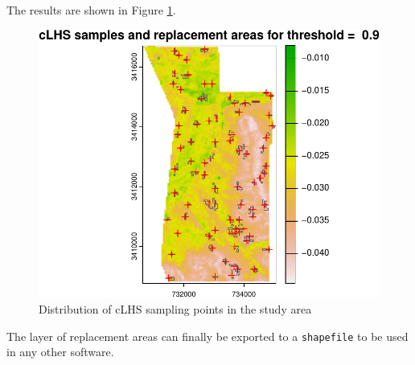 \documentclass[
  10pt,
  b5paper,
  oneside]{book}
\newenvironment{Shaded}{\begin{snugshade}}{\end{snugshade}}
\newcommand{\AttributeTok}[1]{\textcolor[rgb]{0.77,0.63,0.00}{#1}}
\newcommand{\ConstantTok}[1]{\textcolor[rgb]{0.00,0.00,0.00}{#1}}
\newcommand{\DecValTok}[1]{\textcolor[rgb]{0.00,0.00,0.81}{#1}}
\newcommand{\FunctionTok}[1]{\textcolor[rgb]{0.00,0.00,0.00}{#1}}
\newcommand{\NormalTok}[1]{#1}
\newcommand{\SpecialCharTok}[1]{\textcolor[rgb]{0.00,0.00,0.00}{#1}}
\newcommand{\StringTok}[1]{\textcolor[rgb]{0.31,0.60,0.02}{#1}}
\begin{document}
The results are shown in Figure \ref{fig:fig-24}.

\begin{Shaded}
\end{Shaded}

\begin{figure}
\centering
\includegraphics{Technical-Manual-Soil-Sampling-Design_files/figure-latex/fig-24-1.pdf}
\caption{\label{fig:fig-24}Distribution of cLHS sampling points in the study area}
\end{figure}

The layer of replacement areas can finally be exported to a \texttt{\textquotesingle{}shapefile\textquotesingle{}} to be used in any other software.
\end{document}
